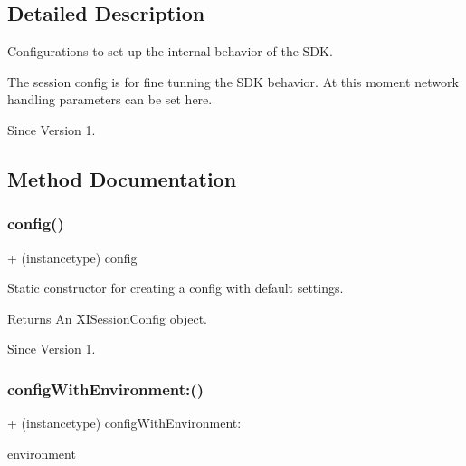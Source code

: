 \subsection{Detailed Description}
Configurations to set up the internal behavior of the S\+DK. 

The session config is for fine tunning the S\+DK behavior. At this moment network handling parameters can be set here. \begin{DoxySince}{Since}
Version 1. 
\end{DoxySince}


\subsection{Method Documentation}
\hypertarget{class_x_i_sdk_config_a7fed9db56ae4a91646296d35c6cb25b5}{}\label{class_x_i_sdk_config_a7fed9db56ae4a91646296d35c6cb25b5} 
\subsubsection{\texorpdfstring{config()}{config()}}
{\footnotesize\ttfamily + (instancetype) config \begin{DoxyParamCaption}{ }\end{DoxyParamCaption}}



Static constructor for creating a config with default settings. 

\begin{DoxyReturn}{Returns}
An X\+I\+Session\+Config object. 
\end{DoxyReturn}
\begin{DoxySince}{Since}
Version 1. 
\end{DoxySince}
\hypertarget{class_x_i_sdk_config_afa1234314350e4363b3540809540812b}{}\label{class_x_i_sdk_config_afa1234314350e4363b3540809540812b} 
\subsubsection{\texorpdfstring{config\+With\+Environment\+:()}{configWithEnvironment:()}}
{\footnotesize\ttfamily + (instancetype) config\+With\+Environment\+: \begin{DoxyParamCaption}\item[{(X\+I\+Environment)}]{environment }\end{DoxyParamCaption}}



